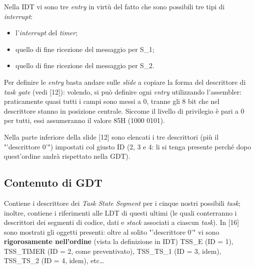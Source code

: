 Nella IDT vi sono tre \textit{entry} in virtù del fatto che sono possibili tre tipi di \textit{interrupt}:
\begin{itemize}
\item l'\textit{interrupt} del \textit{timer};
\item quello di fine ricezione del messaggio per S\_1;
\item quello di fine ricezione del messaggio per S\_2.
\end{itemize}

Per definire le\textit{ entry} basta andare sulle \textit{slide} a copiare la forma del descrittore di \textit{task gate} (vedi [12]): volendo, si può definire ogni \textit{entry} utilizzando l'assembler: praticamente quasi tutti i campi sono messi a 0, tranne gli 8 bit che nel descrittore stanno in posizione centrale. Siccome il livello di privilegio è pari a 0 per tutti, essi assumeranno il valore 85H (1000 0101).

Nella parte inferiore della slide [12] sono elencati i tre descrittori (più il "'descrittore 0'") impostati col giusto ID (2, 3 e 4: li si tenga presente perché dopo quest'ordine andrà rispettato nella GDT).

\subsection{Contenuto di GDT}

Contiene i descrittore dei \textit{Task State Segment} per i cinque nostri possibili \textit{task}; inoltre, contiene i riferimenti alle LDT di questi ultimi (le quali conterranno i descrittori dei segmenti di codice, dati e \textit{stack} associati a ciascun \textit{task}).
In [16] sono mostrati gli oggetti presenti: oltre al solito "'descrittore 0'" vi sono \textbf{rigorosamente nell'ordine} (vista la definizione in IDT) TSS\_E (ID = 1), TSS\_TIMER (ID = 2, come preventivato), TSS\_TS\_1 (ID = 3, idem), TSS\_TS\_2 (ID = 4, idem), etc\ldots
